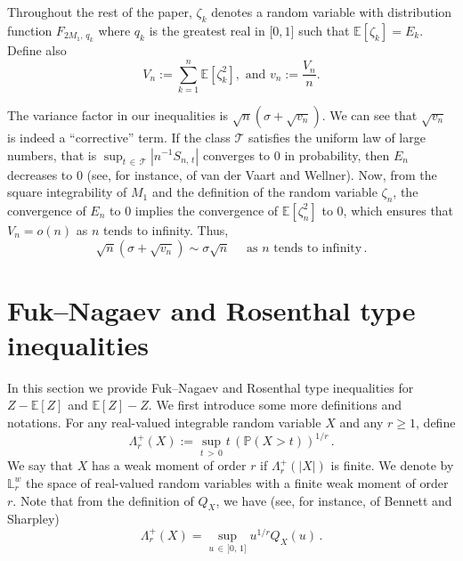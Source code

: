 \documentclass[AHL,Unicode,longabstracts,published]{cedram}
\newcommand{\bE}{\mathbb{E}}
\newcommand{\bL}{\mathbb{L}}
\newcommand{\bP}{\mathbb{P}}
\newcommand{\cT}{\mathcal{T}}
\newcommand{\intervalleff}[2]{\mathopen{[} #1\mathclose{}\mathpunct{},#2\mathclose{]}}
\begin{document}
\begin{nota}
Throughout the rest of the paper, $\zeta_k$ denotes a random variable with distribution function $F_{2M_1,\,q_k}$ where $q_k$ is the greatest real in $\intervalleff 01$ such that $\bE[\zeta_k]=E_k$. Define also
\begin{equation}\label{def:V_n}
V_n:=\sum_{k=1}^n \bE\left[\zeta_k^2\right],\text{ and } v_n:=\frac{V_n}{n}.
\end{equation}
\end{nota}

The variance factor in our inequalities is $\sqrt n(\sigma+\sqrt{v_n})$. We can see that $\sqrt{v_n}$ is indeed a ``corrective'' term. If the class $\cT$ satisfies the uniform law of large numbers, that is $\sup_{t\,\in\,\cT}|n^{-1}S_{n,\,t}|$ converges to $0$ in probability, then $E_n$ decreases to 0 (see, for instance, \cite[Section~2.4]{vdVW96} of van der Vaart and Wellner). Now, from the square integrability of $M_1$ and the definition of the random variable $\zeta_n$, the convergence of $E_n$ to $0$ implies the convergence of $\bE[\zeta_n^2]$ to 0, which ensures that $V_n=o(n)$ as $n$ tends to infinity. Thus,
\begin{equation}
\sqrt n(\sigma+\sqrt{v_n})\sim\sigma\sqrt n\quad\text{ as $n$ tends to infinity}\,.
\end{equation}

\section{Fuk--Nagaev and Rosenthal type inequalities}\label{section:FukNagaev Rosenthal}
In this section we provide Fuk--Nagaev and Rosenthal type inequalities for $Z-\bE[Z]$ and $\bE[Z]-Z$. We first introduce some more definitions and notations. For any real-valued integrable random variable $X$ and any $r\geq 1$, define
\begin{equation}\label{eqn:def weak norm}
\Lambda_r^+(X):=\sup_{t\,>\,0} t\,(\bP(X>t))^{1/r}\,.
\end{equation}
We say that $X$ has a weak moment of order $r$ if $\Lambda_r^+(|X|)$ is finite. We denote by $\bL_r^w$ the space of real-valued random variables with a finite weak moment of order $r$. Note that from the definition of $Q_X$, we have (see, for instance, \cite[Chapter~4]{BS88} of Bennett and Sharpley)
\begin{equation}
\Lambda_r^+(X)=\sup_{u\,\in\,]0,\,1]}u^{1/r}Q_X(u)\,.
\end{equation}
\end{document}
